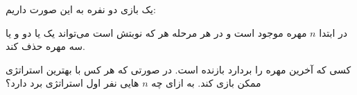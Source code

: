 \begin{PROBLEM}
	\p
	یک بازی دو نفره به این صورت داریم:

	در ابتدا 
	$n$
	مهره موجود است و در هر مرحله هر که نوبتش است می‌تواند
	یک یا دو و یا سه مهره حذف کند.

	کسی که آخرین مهره را بردارد بازنده است.
	در صورتی که هر کس با بهترین استراتژی ممکن بازی کند.
	به ازای چه 
	$n$
	هایی نفر اول استراتژی برد دارد؟
	\SOLUTION{
		\p
		
	}
\end{PROBLEM}